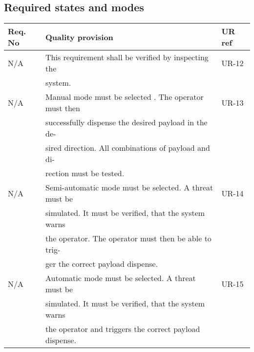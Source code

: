 \subsection{Required states and modes}
\begin{center}
    \begin{tabular}{ | l | l | l |}
    \hline	  
    Req. No & Quality provision  									& UR ref \\ \hline
		N/A & This requirement shall be verified by inspecting the  & UR-12 \\
            & system.                                               &\\ \hline
		N/A & Manual mode must be selected . The operator must then & UR-13 \\
			& successfully dispense the desired payload in the de-  &\\
			& sired direction. All combinations of payload and di-  &\\
            & rection must be tested.                               &\\ \hline
		N/A & Semi-automatic mode must be selected. A threat must be& UR-14 \\
			& simulated. It must be verified, that the system warns	&\\
			& the operator. The operator must then be able to trig- &\\ 	
			& ger the correct payload dispense.                     &\\ \hline
        N/A & Automatic mode must be selected. A threat must be     & UR-15 \\
			& simulated. It must be verified, that the system warns &\\
			& the operator and triggers the correct payload dispense.&\\ \hline	
    \end{tabular}
\end{center}

